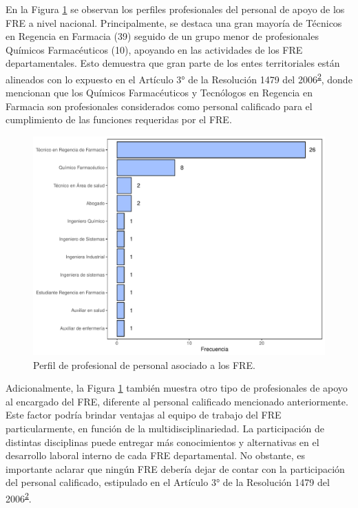 \documentclass[
  oneside]{book}
\begin{document}
En la Figura \ref{fig:perfilProfesional2} se observan los perfiles profesionales del personal de apoyo de los FRE a nivel nacional. Principalmente, se destaca una gran mayoría de Técnicos en Regencia en Farmacia (39) seguido de un grupo menor de profesionales Químicos Farmacéuticos (10), apoyando en las actividades de los FRE departamentales. Esto demuestra que gran parte de los entes territoriales están alineados con lo expuesto en el Artículo 3° de la Resolución 1479 del 2006\textsuperscript{\protect\hyperlink{ref-MSPS1479-2006}{2}}, donde mencionan que los Químicos Farmacéuticos y Tecnólogos en Regencia en Farmacia son profesionales considerados como personal calificado para el cumplimiento de las funciones requeridas por el FRE.

\begin{figure}[t!]

{\centering \includegraphics[width=0.9\linewidth]{InformeFinal_files/figure-latex/perfilProfesional2-1} 

}

\caption{Perfil de profesional de personal asociado a los FRE.}\label{fig:perfilProfesional2}
\end{figure}

Adicionalmente, la Figura \ref{fig:perfilProfesional2} también muestra otro tipo de profesionales de apoyo al encargado del FRE, diferente al personal calificado mencionado anteriormente. Este factor podría brindar ventajas al equipo de trabajo del FRE particularmente, en función de la multidisciplinariedad. La participación de distintas disciplinas puede entregar más conocimientos y alternativas en el desarrollo laboral interno de cada FRE departamental. No obstante, es importante aclarar que ningún FRE debería dejar de contar con la participación del personal calificado, estipulado en el Artículo 3° de la Resolución 1479 del 2006\textsuperscript{\protect\hyperlink{ref-MSPS1479-2006}{2}}.
\end{document}
